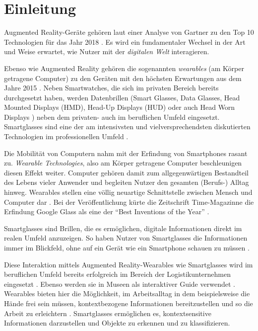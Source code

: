 %
%
%
%
%
%
\chapter{Einleitung}
\label{ch:Einleitung}
Augmented Reality-Geräte gehören laut einer Analyse von Gartner zu den Top 10 Technologien für das Jahr 2018 \cite{Panetta2017a}. Es wird ein fundamentaler Wechsel in der Art und Weise erwartet, wie Nutzer mit der \emph{digitalen Welt} interagieren. 

Ebenso wie Augmented Reality gehören die sogenannten \emph{wearables} (am Körper getragene Computer) zu den Geräten mit den höchsten Erwartungen aus dem Jahre 2015 \cite{Levy2015}. Neben Smartwatches, die sich im privaten Bereich bereits durchgesetzt haben, werden Datenbrillen (Smart Glasses, Data Glasses, Head Mounted Displays (HMD), Head-Up Displays (HUD) oder auch Head Worn Displays \cite{Zobel2016}) neben dem privaten- auch im beruflichen Umfeld eingesetzt. Smartglasses sind eine der am intensivsten und vielversprechendsten diskutierten Technologien im professionellen Umfeld \cite{Hein2016}.

Die Mobilität von Computern nahm mit der Erfindung von Smartphones rasant zu. \emph{Wearable Technologies}, also am Körper getragene Computer beschleunigen diesen Effekt weiter. Computer gehören damit zum allgegenwärtigen Bestandteil des Lebens vieler Anwender und begleiten Nutzer den gesamten (Berufs-) Alltag hinweg. Wearables stellen eine völlig neuartige Schnittstelle zwischen Mensch und Computer dar \cite[S.~25f]{Schwenke2016}. Bei der Veröffentlichung kürte die Zeitschrift Time-Magazinne die Erfindung Google Glass als eine der \enquote{Best Inventions of the Year} \cite{Bilton2015}.

Smartglasses sind Brillen, die es ermöglichen, digitale Informationen direkt im realen Umfeld anzuzeigen. So haben Nutzer von Smartglasses die Informationen immer im Blickfeld, ohne auf ein Gerät wie ein Smartphone schauen zu müssen \cite{Due2014Glasses}.

Diese Interaktion mittels Augmented Reality-Wearables wie Smartglasses wird im beruflichen Umfeld bereits erfolgreich im Bereich der Logistikunternehmen eingesetzt \cite{Plutz}.
Ebenso werden sie in Museen als interaktiver Guide verwendet \cite{Hein2016}. 
Wearables bieten hier die Möglichkeit, im Arbeitsalltag in dem beispielsweise die Hände frei sein müssen, kontextbezogene Informationen bereitzustellen und so die Arbeit zu erleichtern \cite{Zobel2016}. Smartglasses ermöglichen es, kontextsensitive Informationen darzustellen und Objekte zu erkennen und zu klassifizieren.

